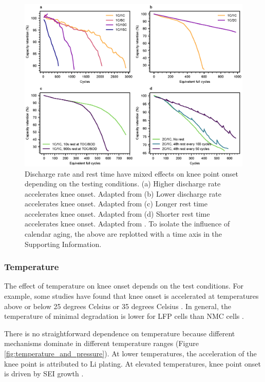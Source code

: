 \documentclass[journal=jpclcd,manuscript=article]{achemso}
\begin{document}
\begin{figure}[ht!]
\centering
\includegraphics[scale = 1.0]{figures/discharge_rate_rest_cycles.eps}
\caption{Discharge rate and rest time have mixed effects on knee point onset depending on the testing conditions. (a) Higher discharge rate accelerates knee onset. Adapted from \cite{omar_lithium_2014} (b) Lower discharge rate accelerates knee onset. Adapted from \cite{keil_linear_2019} (c) Longer rest time accelerates knee onset. Adapted from \cite{keil_linear_2019} (d) Shorter rest time accelerates knee onset. Adapted from \cite{epding_investigation_2019}. To isolate the influence of calendar aging, the above are replotted with a time axis in the Supporting Information.  }
\label{fig:discharge-rest_cycle}
\end{figure}


\subsubsection{Temperature}
The effect of temperature on knee onset depends on the test conditions. For example, some studies have found that knee onset is accelerated at temperatures above or below 25 degrees Celsius \cite{zhang_accelerated_2019, waldmann_temperature_2014, waldmann_optimization_2015} or 35 degrees Celsius \cite{schuster_nonlinear_2015}. In general, the temperature of minimal degradation is lower for LFP cells than NMC cells \cite{preger_degradation_2020}. 

There is no straightforward dependence on temperature because different mechanisms dominate in different temperature ranges (Figure \ref{fig:temperature_and_pressure}). At lower temperatures, the acceleration of the knee point is attributed to Li plating. At elevated temperatures, knee point onset is driven by SEI growth \cite {zhang_accelerated_2019,schuster_nonlinear_2015,waldmann_temperature_2014,waldmann_optimization_2015}.
\end{document}
